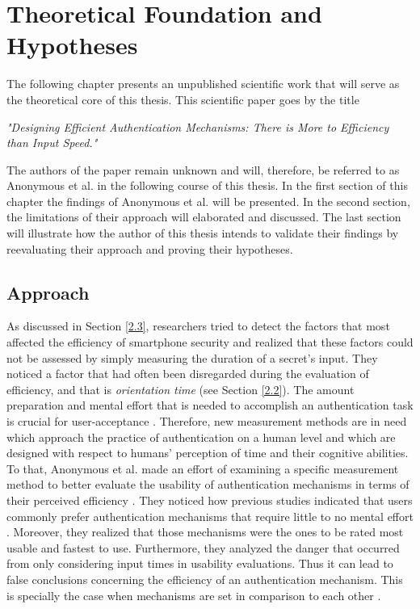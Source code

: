 
\chapter{Theoretical Foundation and Hypotheses}\label{ch:third}


The following chapter presents an unpublished scientific work that will serve as the theoretical core of this thesis. This scientific paper goes by the title 
\begin{center}
 \textit{"Designing Efficient Authentication Mechanisms: There is More to Efficiency than Input Speed."}   
\end{center}
The authors of the paper remain unknown and will, therefore, be referred to as Anonymous et al. \cite{anonymous} in the following course of this thesis. In the first section of this chapter the findings of Anonymous et al. \cite{anonymous} will be presented. In the second section, the limitations of their approach will elaborated and discussed. The last section will illustrate how the author of this thesis intends to validate their findings by reevaluating their approach and proving their hypotheses.

\section{Approach}

As discussed in Section \ref{2.3}, researchers tried to detect the factors that most affected the efficiency of smartphone security and realized that these factors could not be assessed by simply measuring the duration of a secret's input. They noticed a factor that had often been disregarded during the evaluation of efficiency, and that is \textit{orientation time} (see Section \ref{2.2}). The amount preparation and mental effort that is needed to accomplish an authentication task is crucial for user-acceptance \cite{anonymous}. Therefore, new measurement methods are in need which approach the practice of authentication on a human level and which are designed with respect to humans' perception of time and their cognitive abilities. \\

To that, Anonymous et al. \cite{anonymous} made an effort of examining a specific measurement method to better evaluate the usability of authentication mechanisms in terms of their perceived efficiency \cite{anonymous}. They noticed how previous studies indicated that users commonly prefer authentication mechanisms that require little to no mental effort \cite{anonymous, AnatomySmartphone}. Moreover, they realized that those mechanisms were the ones to be rated most usable and fastest to use. Furthermore, they analyzed the danger that occurred from only considering input times in usability evaluations. Thus it can lead to false conclusions concerning the efficiency of an authentication mechanism. This is specially the case when mechanisms are set in comparison to each other \cite{anonymous}. \\

